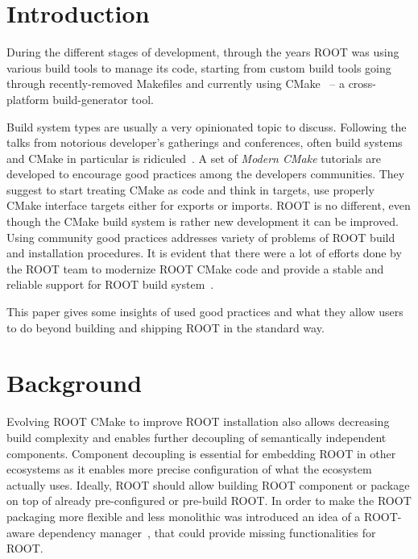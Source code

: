 \documentclass[12pt]{iopart}
\begin{document}
\section{Introduction}

During the different stages of development, through the years ROOT \cite{root} was using various build tools to manage its code, starting from custom build tools going through recently-removed Makefiles and currently using CMake~\cite{cmake} -- a cross-platform build-generator tool.

Build system types are usually a very opinionated topic to discuss. Following the talks from notorious developer's gatherings and conferences, often build systems and CMake in particular is ridiculed~\cite{moderncmake}. A set of \textit{Modern CMake} tutorials are developed to encourage good practices among the developers communities. They suggest to start treating CMake as code and think in targets, use properly CMake interface targets either for exports or imports. ROOT is no different, even though the CMake build system is rather new development it can be improved. Using community good practices addresses variety of problems of ROOT build and installation procedures. It is evident that there were a lot of efforts done by the ROOT team to modernize ROOT CMake code and provide a stable and reliable support for ROOT build system~\cite{rootcmake}.

This paper gives some insights of used good practices and what they allow users to do beyond building and shipping ROOT in the standard way.

\section{Background}

Evolving ROOT CMake to improve ROOT installation also allows decreasing build complexity and enables further decoupling of semantically independent components. Component decoupling is essential for embedding ROOT in other ecosystems as it enables more precise configuration of what the ecosystem actually uses. Ideally, ROOT should allow building ROOT component or package on top of already pre-configured or pre-build ROOT. In order to make the ROOT packaging more flexible and less monolithic was introduced an idea of a ROOT-aware dependency manager~\cite{pm}, that could provide missing functionalities for ROOT.

\end{document}
